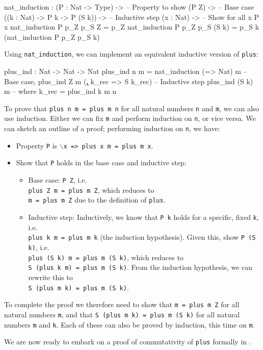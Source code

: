 \begin{code}
nat_induction : (P : Nat -> Type) ->             -- Property to show
                (P Z) ->                         -- Base case 
                ((k : Nat) -> P k -> P (S k)) -> -- Inductive step
                (x : Nat) ->                     -- Show for all x
                P x
nat_induction P p_Z p_S Z = p_Z
nat_induction P p_Z p_S (S k) = p_S k (nat_induction P p_Z p_S k)
\end{code}

\noindent
Using \texttt{nat\_induction}, we can implement an equivalent inductive
version of \texttt{plus}:

\begin{code}
plus_ind : Nat -> Nat -> Nat
plus_ind n m 
   = nat_induction (\x => Nat)
                   m                      -- Base case, plus_ind Z m
                   (\k, k_rec => S k_rec) -- Inductive step plus_ind (S k) m
                                          -- where k_rec = plus_ind k m
                   n 
\end{code}

\noindent
To prove that \texttt{plus n m = plus m n} for all natural numbers \texttt{n}
and \texttt{m}, we can also use induction. Either we can fix \texttt{m} and
perform induction on \texttt{n}, or vice versa. We can sketch an outline of
a proof; performing induction on 
\texttt{n}, we have:

\begin{itemize}
\item Property \texttt{P} is \texttt{$\backslash$x => plus x m = plus m x}.
\item Show that \texttt{P} holds in the base case and inductive step:
\begin{itemize}
\item Base case: \texttt{P Z}, i.e. \\
\texttt{plus Z m = plus m Z}, which reduces to \\
\texttt{m = plus m Z} due to the definition of \texttt{plus}.
\item Inductive step: Inductively, we know that \texttt{P k} holds for a
specific, fixed \texttt{k}, i.e.\\
\texttt{plus k m = plus m k} (the induction hypothesis). Given this,
show \texttt{P (S k)}, i.e. \\
\texttt{plus (S k) m = plus m (S k)}, which
reduces to \\
\texttt{S (plus k m) = plus m (S k)}. From the induction hypothesis, we can rewrite this to \\
\texttt{S (plus m k) = plus m (S k)}.
\end{itemize}
\end{itemize}

\noindent
To complete the proof we therefore need to show that \texttt{m = plus m Z}
for all natural numbers \texttt{m}, and that \texttt{S (plus m k) = plus m (S k)}
for all natural numbers \texttt{m} and \texttt{k}. Each of these can also
be proved by induction, this time on \texttt{m}.

We are now ready to embark on a proof of commutativity of \texttt{plus}
formally in \Idris{}.

